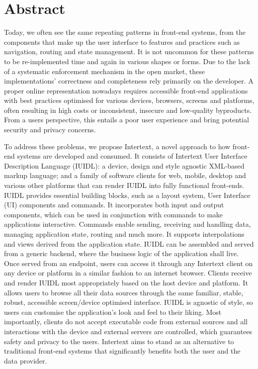 

\section*{Abstract}

Today, we often see the same repeating patterns in front-end systems, from the components that make up the user interface to features and practices such as navigation, routing and state management. It is not uncommon for these patterns to be re-implemented time and again in various shapes or forms. Due to the lack of a systematic enforcement mechanism in the open market, these implementations' correctness and completeness rely primarily on the developer. A proper online representation nowadays requires accessible front-end applications with best practices optimised for various devices, browsers, screens and platforms, often resulting in high costs or inconsistent, insecure and low-quality byproducts. From a users perspective, this entails a poor user experience and bring potential security and privacy concerns. 

To address these problems, we propose Intertext, a novel approach to how front-end systems are developed and consumed. It consists of Intertext User Interface Description Language (IUIDL): a device, design and style agnostic XML-based markup language; and a family of software clients for web, mobile, desktop and various other platforms that can render IUIDL into fully functional front-ends. IUIDL provides essential building blocks, such as a layout system, User Interface (UI) components and commands. It incorporates both input and output components, which can be used in conjunction with commands to make applications interactive. Commands enable sending, receiving and handling data, managing application state, routing and much more. It supports interpolations and views derived from the application state. IUIDL can be assembled and served from a generic backend, where the business logic of the application shall live. Once served from an endpoint, users can access it through any Intertext client on any device or platform in a similar fashion to an internet browser. Clients receive and render IUIDL most appropriately based on the host device and platform. It allows users to browse all their data sources through the same familiar, stable, robust, accessible screen/device optimised interface. IUIDL is agnostic of style, so users can customise the application's look and feel to their liking. Most importantly, clients do not accept executable code from external sources and all interactions with the device and external servers are controlled, which guarantees safety and privacy to the users. Intertext aims to stand as an alternative to traditional front-end systems that significantly benefits both the user and the data provider.